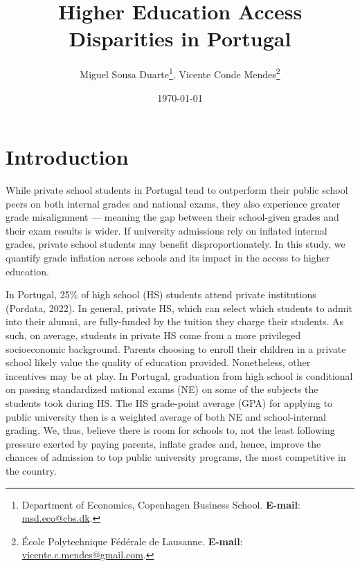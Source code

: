 \documentclass{article}
\begin{document}
\title{Higher Education Access Disparities in Portugal}
\author{Miguel Sousa Duarte\thanks{{\tiny{}Department of Economics, Copenhagen Business School. \textbf{E-mail}: \url{msd.eco@cbs.dk}.}},
Vicente Conde Mendes\thanks{{\tiny{}École Polytechnique Fédérale de Lausanne. \textbf{E-mail}: \url{vicente.c.mendes@gmail.com}.}}\\}

\date{\today}

\setlength{\parskip}{1em}
\maketitle

\section{Introduction}
While private school students in Portugal tend to outperform their public school peers on both internal grades and national exams, they also experience greater grade misalignment — meaning the gap between their school-given grades and their exam results is wider. If university admissions rely on inflated internal grades, private school students may benefit disproportionately. In this study, we quantify grade inflation across schools and its impact in the access to higher education. 

In Portugal, 25\% of high school (HS) students attend private institutions (Pordata, 2022). In general, private HS, which can select which students to admit into their alumni, are fully-funded by the tuition they charge their students. As such, on average, students in private HS come from a more privileged socioeconomic background. Parents choosing to enroll their children in a private school likely value the quality of education provided. Nonetheless, other incentives may be at play. In Portugal, graduation from high school is conditional on passing standardized national exams (NE) on some of the subjects the students took during HS. The HS grade-point average (GPA) for applying to public university then is a weighted average of both NE and school-internal grading. We, thus, believe there is room for schools to, not the least following pressure exerted by paying parents, inflate grades and, hence, improve the chances of admission to top public university programs, the most competitive in the country.
\end{document}

